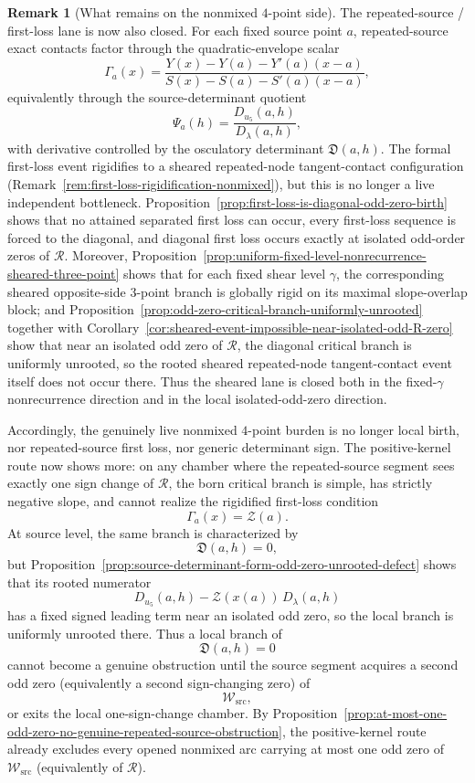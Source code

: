 \documentclass[11pt,a4paper]{amsart}
\theoremstyle{plain}
\theoremstyle{definition}
\newtheorem{remark}[theorem]{Remark}
\begin{document}
\begin{remark}[What remains on the nonmixed $4$-point side]
The repeated-source / first-loss lane is now also closed. For each fixed
source point $a$, repeated-source exact contacts factor through the
quadratic-envelope scalar
\[
\Gamma_a(x)=
\frac{Y(x)-Y(a)-Y'(a)(x-a)}
{S(x)-S(a)-S'(a)(x-a)},
\]
equivalently through the source-determinant quotient
\[
\Psi_a(h)=\frac{D_{u_5}(a,h)}{D_\lambda(a,h)},
\]
with derivative controlled by the osculatory determinant
$\mathfrak D(a,h)$. The formal first-loss event rigidifies to a sheared
repeated-node tangent-contact configuration
(Remark~\ref{rem:first-loss-rigidification-nonmixed}), but this is no longer a
live independent bottleneck. Proposition~\ref{prop:first-loss-is-diagonal-odd-zero-birth}
shows that no attained separated first loss can occur, every first-loss
sequence is forced to the diagonal, and diagonal first loss occurs exactly at
isolated odd-order zeros of $\mathcal R$. Moreover,
Proposition~\ref{prop:uniform-fixed-level-nonrecurrence-sheared-three-point}
shows that for each fixed shear level $\gamma$, the corresponding sheared
opposite-side $3$-point branch is globally rigid on its maximal slope-overlap
block; and
Proposition~\ref{prop:odd-zero-critical-branch-uniformly-unrooted} together
with Corollary~\ref{cor:sheared-event-impossible-near-isolated-odd-R-zero}
show that near an isolated odd zero of $\mathcal R$, the diagonal critical
branch is uniformly unrooted, so the rooted sheared repeated-node
tangent-contact event itself does not occur there. Thus the sheared lane is
closed both in the fixed-$\gamma$ nonrecurrence direction and in the local
isolated-odd-zero direction.

Accordingly, the genuinely live nonmixed $4$-point burden is no longer local
birth, nor repeated-source first loss, nor generic determinant sign.  The
positive-kernel route now shows more: on any chamber where the repeated-source
segment sees exactly one sign change of $\mathcal R$, the born critical branch
is simple, has strictly negative slope, and cannot realize the rigidified
first-loss condition
\[
\Gamma_a(x)=\mathcal Z(a).
\]
At source level, the same branch is characterized by
\[
\mathfrak D(a,h)=0,
\]
but
Proposition~\ref{prop:source-determinant-form-odd-zero-unrooted-defect}
shows that its rooted numerator
\[
D_{u_5}(a,h)-\mathcal Z(x(a))\,D_\lambda(a,h)
\]
has a fixed signed leading term near an isolated odd zero, so the local branch
is uniformly unrooted there. Thus a local branch of
\[
\mathfrak D(a,h)=0
\]
cannot become a genuine obstruction until the source segment acquires a second
odd zero (equivalently a second sign-changing zero) of
\[
\mathcal W_{\mathrm{src}},
\]
or exits the local one-sign-change chamber. By
Proposition~\ref{prop:at-most-one-odd-zero-no-genuine-repeated-source-obstruction},
the positive-kernel route already excludes every opened nonmixed arc carrying
at most one odd zero of $\mathcal W_{\mathrm{src}}$ (equivalently of
$\mathcal R$).


\end{remark}
\end{document}

